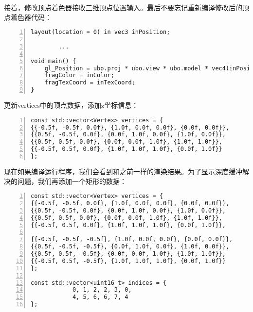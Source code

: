 \documentclass{ctexart}
\begin{document}
接着，修改顶点着色器接收三维顶点位置输入。最后不要忘记重新编译修改后的顶点着色器代码：

\begin{lstlisting}[language={[ANSI]C},keywordstyle=\color{blue!70},commentstyle=\color{red!50!green!50!blue!50},frame=shadowbox, rulesepcolor=\color{red!20!green!20!blue!20},basicstyle=\small,numbers=left, numberstyle=\tiny,breaklines=true]
layout(location = 0) in vec3 inPosition;

		...

void main() {
	gl_Position = ubo.proj * ubo.view * ubo.model * vec4(inPosition, 1.0);
	fragColor = inColor;
	fragTexCoord = inTexCoord;
}
\end{lstlisting}

更新vertices中的顶点数据，添加z坐标信息：

\begin{lstlisting}[language={[ANSI]C},keywordstyle=\color{blue!70},commentstyle=\color{red!50!green!50!blue!50},frame=shadowbox, rulesepcolor=\color{red!20!green!20!blue!20},basicstyle=\small,numbers=left, numberstyle=\tiny,breaklines=true]
const std::vector<Vertex> vertices = {
{{-0.5f, -0.5f, 0.0f}, {1.0f, 0.0f, 0.0f}, {0.0f, 0.0f}},
{{0.5f, -0.5f, 0.0f}, {0.0f, 1.0f, 0.0f}, {1.0f, 0.0f}},
{{0.5f, 0.5f, 0.0f}, {0.0f, 0.0f, 1.0f}, {1.0f, 1.0f}},
{{-0.5f, 0.5f, 0.0f}, {1.0f, 1.0f, 1.0f}, {0.0f, 1.0f}}
};
\end{lstlisting}

现在如果编译运行程序，我们会看到和之前一样的渲染结果。为了显示深度缓冲解决的问题，我们再添加一个矩形的数据：

\begin{lstlisting}[language={[ANSI]C},keywordstyle=\color{blue!70},commentstyle=\color{red!50!green!50!blue!50},frame=shadowbox, rulesepcolor=\color{red!20!green!20!blue!20},basicstyle=\small,numbers=left, numberstyle=\tiny,breaklines=true]
const std::vector<Vertex> vertices = {
{{-0.5f, -0.5f, 0.0f}, {1.0f, 0.0f, 0.0f}, {0.0f, 0.0f}},
{{0.5f, -0.5f, 0.0f}, {0.0f, 1.0f, 0.0f}, {1.0f, 0.0f}},
{{0.5f, 0.5f, 0.0f}, {0.0f, 0.0f, 1.0f}, {1.0f, 1.0f}},
{{-0.5f, 0.5f, 0.0f}, {1.0f, 1.0f, 1.0f}, {0.0f, 1.0f}},

{{-0.5f, -0.5f, -0.5f}, {1.0f, 0.0f, 0.0f}, {0.0f, 0.0f}},
{{0.5f, -0.5f, -0.5f}, {0.0f, 1.0f, 0.0f}, {1.0f, 0.0f}},
{{0.5f, 0.5f, -0.5f}, {0.0f, 0.0f, 1.0f}, {1.0f, 1.0f}},
{{-0.5f, 0.5f, -0.5f}, {1.0f, 1.0f, 1.0f}, {0.0f, 1.0f}}
};

const std::vector<uint16_t> indices = {
			0, 1, 2, 2, 3, 0,
			4, 5, 6, 6, 7, 4
};
\end{lstlisting}
\end{document}
